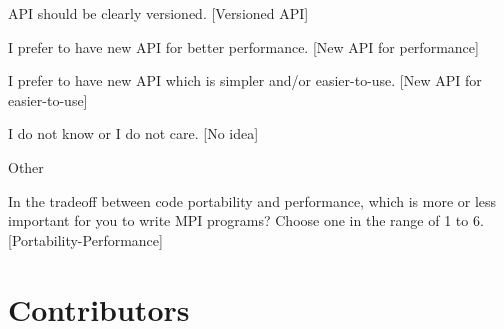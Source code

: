 \documentclass[preprint,5p,times]{elsarticle}
\def\Countries{Contributors\xspace{}}%
\begin{document}
{\begin{description}
\begin{inparaenum}[{\bf C}1)]
    \item API should be clearly versioned. [Versioned API]
    \item I prefer to have new API for better performance. [New API for performance]
    \item I prefer to have new API which is simpler and/or
      easier-to-use. [New API for easier-to-use]
    \item I do not know or I do not care. [No idea]
    \item Other
    \end{inparaenum}
  \item[Q29:] In the tradeoff between code portability and performance,
    which is more or less important for you to write MPI programs?
    Choose one in the range of 1 to 6. [Portability-Performance]
  \end{description}
}

\section{\Countries}
\label{app:countries}
\end{document}

